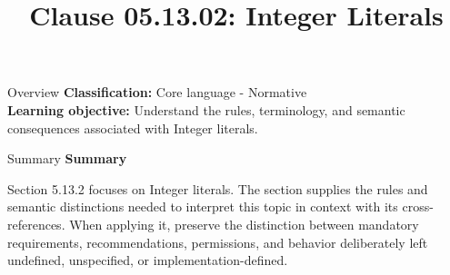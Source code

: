 \documentclass[10pt,letterpaper]{article}
\title{Clause 05.13.02: Integer Literals}
\author{}
\date{}
\begin{document}
\maketitle
\begin{CornellOverviewBox}{Overview}
\textbf{Classification:} Core language - Normative\\[2pt]
\textbf{Learning objective:} Understand the rules, terminology, and semantic consequences associated with Integer literals.
\end{CornellOverviewBox}\begin{CornellSummaryBox}{Summary}
{\sffamily\bfseries\color{Accent} Summary}\par\vspace{3pt}Section 5.13.2 focuses on Integer literals. The section supplies the rules and semantic distinctions needed to interpret this topic in context with its cross-references. When applying it, preserve the distinction between mandatory requirements, recommendations, permissions, and behavior deliberately left undefined, unspecified, or implementation-defined.
\end{CornellSummaryBox}
\end{document}
